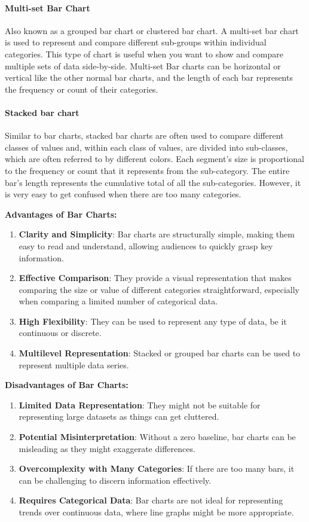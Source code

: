 \documentclass{article}\usepackage[]{graphicx}\usepackage[]{xcolor}
\begin{document}
\paragraph{Multi-set Bar Chart}
Also known as a grouped bar chart or clustered bar chart. A multi-set bar chart is used to represent and compare different sub-groups within individual categories. This type of chart is useful when you want to show and compare multiple sets of data side-by-side.
Multi-set Bar charts can be horizontal or vertical like the other normal bar charts, and the length of each bar represents the frequency or count of their categories.
\paragraph{Stacked bar chart}
Similar to bar charts, stacked bar charts are often used to compare different classes of values and, within each class of values, are divided into sub-classes, which are often referred to by different colors. Each segment's size is proportional to the frequency or count that it represents from the sub-category. The entire bar's length represents the cumulative total of all the sub-categories.
However, it is very easy to get confused when there are too many categories.

\textbf{Advantages of Bar Charts:}
\begin{enumerate}
\item \textbf{Clarity and Simplicity}: Bar charts are structurally simple, making them easy to read and understand, allowing audiences to quickly grasp key information.
    \item \textbf{Effective Comparison}: They provide a visual representation that makes comparing the size or value of different categories straightforward, especially when comparing a limited number of categorical data.
    \item \textbf{High Flexibility}: They can be used to represent any type of data, be it continuous or discrete.
    \item \textbf{Multilevel Representation}: Stacked or grouped bar charts can be used to represent multiple data series.
\end{enumerate}

\textbf{Disadvantages of Bar Charts:}
\begin{enumerate}
    \item \textbf{Limited Data Representation}: They might not be suitable for representing large datasets as things can get cluttered.
    \item \textbf{Potential Misinterpretation}: Without a zero baseline, bar charts can be misleading as they might exaggerate differences.
    \item \textbf{Overcomplexity with Many Categories}: If there are too many bars, it can be challenging to discern information effectively.
    \item \textbf{Requires Categorical Data}: Bar charts are not ideal for representing trends over continuous data, where line graphs might be more appropriate.
\end{enumerate}
\end{document}
